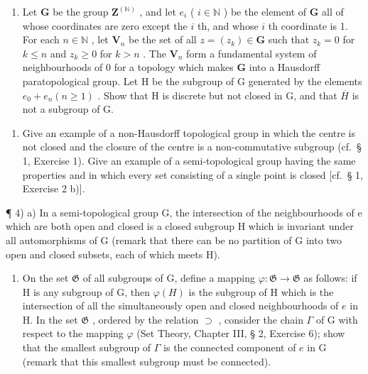 \begin{enumerate}
\def\labelenumi{\alph{enumi})}
\setcounter{enumi}{1}
\tightlist
\item
  Let \(\mathbf{G}\) be the group \(\mathbf{Z}^{(\mathbb{N})}\) , and let \(e_i\) ( \(i \in \mathbb{N}\) ) be the element of \(\mathbf{G}\) all of whose coordinates are zero except the \(i\) th, and whose \(i\) th coordinate is 1. For each \(n \in \mathbb{N}\) , let \(\mathbf{V}_n\) be the set of all \(z = (z_k) \in \mathbf{G}\) such that \(z_k = 0\) for \(k \leqslant n\) and \(z_k \geqslant 0\) for \(k > n\) . The \(\mathbf{V}_n\) form a fundamental system of neighbourhoods of \(0\) for a topology which makes \(\mathbf{G}\) into a Hausdorff paratopological group. Let H be the subgroup of G generated by the elements \(e_{0} + e_{n} (n \geqslant 1)\) . Show that H is discrete but not closed in G, and that \(\overline{H}\) is not a subgroup of G.
\end{enumerate}

\begin{enumerate}
\def\labelenumi{\arabic{enumi})}
\setcounter{enumi}{2}
\tightlist
\item
  Give an example of a non-Hausdorff topological group in which the centre is not closed and the closure of the centre is a non-commutative subgroup (cf.~§ 1, Exercise 1). Give an example of a semi-topological group having the same properties and in which every set consisting of a single point is closed {[}cf.~§ 1, Exercise 2 b){]}.
\end{enumerate}

¶ 4) a) In a semi-topological group G, the intersection of the neighbourhoods of e which are both open and closed is a closed subgroup H which is invariant under all automorphisms of G (remark that there can be no partition of G into two open and closed subsets, each of which meets H).

\begin{enumerate}
\def\labelenumi{\alph{enumi})}
\setcounter{enumi}{1}
\tightlist
\item
  On the set \(\mathfrak{G}\) of all subgroups of G, define a mapping \(\varphi: \mathfrak{G} \to \mathfrak{G}\) as follows: if H is any subgroup of G, then \(\varphi(H)\) is the subgroup of H which is the intersection of all the simultaneously open and closed neighbourhoods of \(e\) in H. In the set \(\mathfrak{G}\) , ordered by the relation \(\supset\) , consider the chain \(\Gamma\) of G with respect to the mapping \(\varphi\) (Set Theory, Chapter III, § 2, Exercise 6); show that the smallest subgroup of \(\Gamma\) is the connected component of \(e\) in G (remark that this smallest subgroup must be connected).
\end{enumerate}


